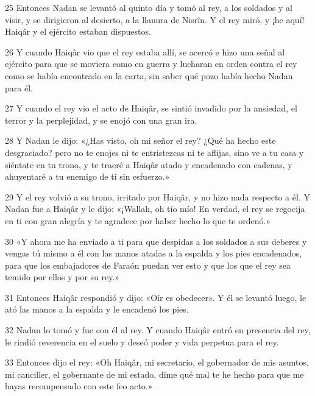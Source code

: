 \par 25 Entonces Nadan se levantó al quinto día y tomó al rey, a los soldados y al visir, y se dirigieron al desierto, a la llanura de Nisrîn. Y el rey miró, y ¡he aquí! Haiqâr y el ejército estaban dispuestos.

\par 26 Y cuando Haiqâr vio que el rey estaba allí, se acercó e hizo una señal al ejército para que se moviera como en guerra y lucharan en orden contra el rey como se había encontrado en la carta, sin saber qué pozo había hecho Nadan para él.

\par 27 Y cuando el rey vio el acto de Haiqâr, se sintió invadido por la ansiedad, el terror y la perplejidad, y se enojó con una gran ira.

\par 28 Y Nadan le dijo: «¿Has visto, oh mi señor el rey? ¿Qué ha hecho este desgraciado? pero no te enojes ni te entristezcas ni te aflijas, sino ve a tu casa y siéntate en tu trono, y te traeré a Haiqâr atado y encadenado con cadenas, y ahuyentaré a tu enemigo de ti sin esfuerzo.»

\par 29 Y el rey volvió a su trono, irritado por Haiqâr, y no hizo nada respecto a él. Y Nadan fue a Haiqâr y le dijo: «¡Wallah, oh tío mío! En verdad, el rey se regocija en ti con gran alegría y te agradece por haber hecho lo que te ordenó.»

\par 30 «Y ahora me ha enviado a ti para que despidas a los soldados a sus deberes y vengas tú mismo a él con las manos atadas a la espalda y los pies encadenados, para que los embajadores de Faraón puedan ver esto y que los que el rey sea temido por ellos y por su rey.»

\par 31 Entonces Haiqâr respondió y dijo: «Oír es obedecer». Y él se levantó luego, le ató las manos a la espalda y le encadenó los pies.

\par 32 Nadan lo tomó y fue con él al rey. Y cuando Haiqâr entró en presencia del rey, le rindió reverencia en el suelo y deseó poder y vida perpetua para el rey.

\par 33 Entonces dijo el rey: «Oh Haiqâr, mi secretario, el gobernador de mis asuntos, mi canciller, el gobernante de mi estado, dime qué mal te he hecho para que me hayas recompensado con este feo acto.»

